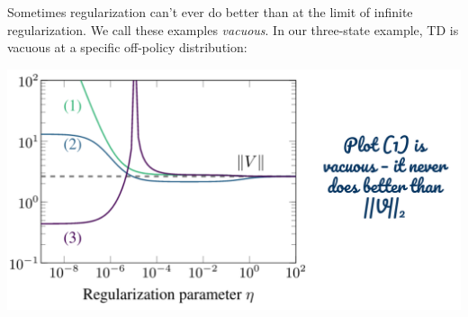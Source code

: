 Sometimes regularization can't ever do better than at the limit of infinite regularization. We call these examples \emph{vacuous}. In our three-state example, TD is vacuous at a specific off-policy distribution:
\vspace{-.1in}
\begin{center}
    \hspace*{1in}
    \includegraphics[scale=0.4]{parts/vacuous/vacuousactual.png}
\end{center}
\vspace{-.5in}
